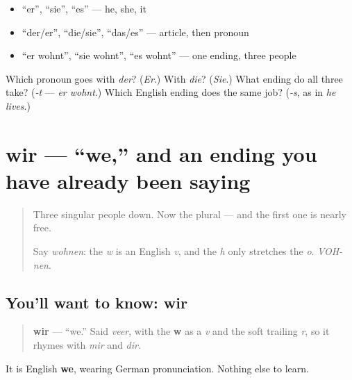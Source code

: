 \begin{itemize}
\raggedright
  \item \textquotedblleft{}er\textquotedblright{}, \textquotedblleft{}sie\textquotedblright{}, \textquotedblleft{}es\textquotedblright{} — he, she, it
  \item \textquotedblleft{}der/er\textquotedblright{}, \textquotedblleft{}die/sie\textquotedblright{}, \textquotedblleft{}das/es\textquotedblright{} — article, then pronoun
  \item \textquotedblleft{}er wohnt\textquotedblright{}, \textquotedblleft{}sie wohnt\textquotedblright{}, \textquotedblleft{}es wohnt\textquotedblright{} — one ending, three people
\end{itemize}

\begin{tcolorbox}[breakable,colback=teal!4,colframe=teal!35!black,title={Before you move on}]
Which pronoun goes with \emph{der}? (\emph{Er}.) With \emph{die}? (\emph{Sie}.) What ending do all three take? (\emph{-t} — \emph{er wohnt}.) Which English ending does the same job? (\emph{-s}, as in \emph{he lives}.)
\end{tcolorbox}
\section[wir]{wir — \textquotedblleft{}we,\textquotedblright{} and an ending you have already been saying}

\label{lesson:GE-C05-wir}



\begin{quote}
Three singular people down. Now the plural — and the first one is nearly free.

Say \emph{wohnen}: the \emph{w} is an English \emph{v}, and the \emph{h} only stretches the \emph{o}. \emph{VOH-nen}.
\end{quote}

\subsection*{You'll want to know: wir}
\begin{quote}
\textbf{wir} — \textquotedblleft{}we.\textquotedblright{} Said \emph{veer}, with the \textbf{w} as a \emph{v} and the soft trailing \emph{r}, so it rhymes with \emph{mir} and \emph{dir}.
\end{quote}

It is English \textbf{we}, wearing German pronunciation. Nothing else to learn.

